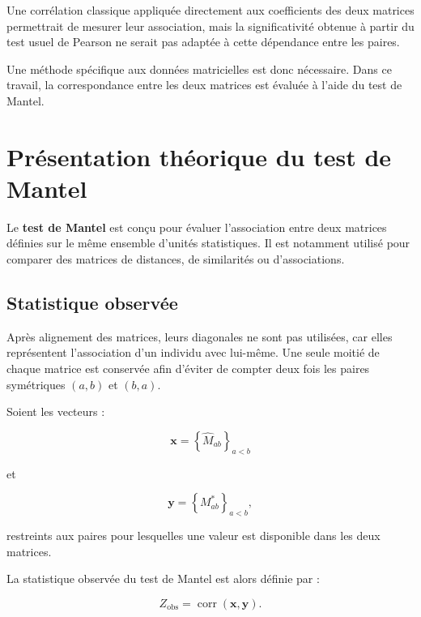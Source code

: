\documentclass[11pt,a4paper]{report}
\begin{document}
Une corrélation classique appliquée directement aux coefficients des
deux matrices permettrait de mesurer leur association, mais la
significativité obtenue à partir du test usuel de Pearson ne serait pas
adaptée à cette dépendance entre les paires.

Une méthode spécifique aux données matricielles est donc nécessaire.
Dans ce travail, la correspondance entre les deux matrices est évaluée
à l'aide du test de Mantel.


\section{Présentation théorique du test de Mantel}
\label{sec:test_mantel}

Le \textbf{test de Mantel} \citep{mantel1967} est conçu pour évaluer
l'association entre deux matrices définies sur le même ensemble
d'unités statistiques. Il est notamment utilisé pour comparer des
matrices de distances, de similarités ou d'associations.

\subsection{Statistique observée}

Après alignement des matrices, leurs diagonales ne sont pas utilisées,
car elles représentent l'association d'un individu avec lui-même. Une
seule moitié de chaque matrice est conservée afin d'éviter de compter
deux fois les paires symétriques $(a,b)$ et $(b,a)$.

Soient les vecteurs :

\begin{equation}
    \mathbf{x}
    =
    \left\{
    \hat{M}_{ab}
    \right\}_{a<b}
\end{equation}

et

\begin{equation}
    \mathbf{y}
    =
    \left\{
    M^*_{ab}
    \right\}_{a<b},
\end{equation}

restreints aux paires pour lesquelles une valeur est disponible dans
les deux matrices.

La statistique observée du test de Mantel est alors définie par :

\begin{equation}
    Z_{\mathrm{obs}}
    =
    \operatorname{corr}(\mathbf{x},\mathbf{y}).
\end{equation}
\end{document}
